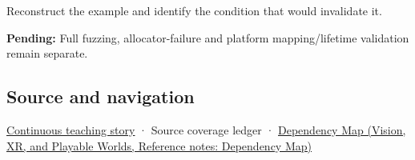 Reconstruct the example and identify the condition that would invalidate it.

\textbf{Pending:} Full fuzzing, allocator-failure and platform mapping/lifetime validation remain separate.

\subsection{Source and navigation}\label{appendix-652d81568de9-source-and-navigation}

\hyperref[01-foundations-i-ch002-bytes-become-a-durable-agreement]{Continuous teaching story} · {Source coverage ledger} · \href{../07-Vision-XR-and-Playable-Worlds/main.pdf\#nameddest=appendix-4ad47bdd269a}{Dependency Map (Vision, XR, and Playable Worlds, Reference notes: Dependency Map)}
